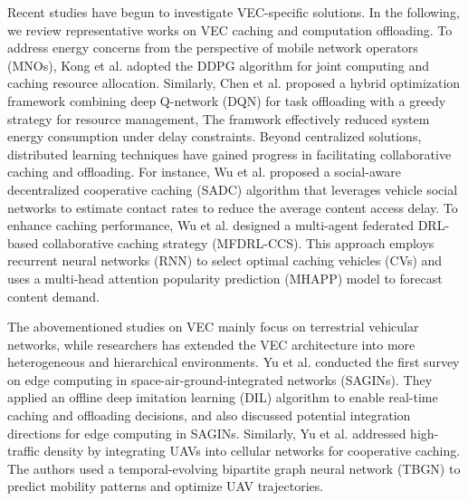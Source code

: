 \documentclass[lettersize,journal]{IEEEtran}
\begin{document}
Recent studies have begun to investigate VEC-specific solutions.
In the following, we review representative works on VEC caching and computation offloading.
%
To address energy concerns from the perspective of mobile network operators (MNOs), Kong et al. \cite{KongDuan-10} adopted the DDPG algorithm for joint computing and caching resource allocation.
%
Similarly, Chen et al. \cite{ChenBhargava-9} proposed a hybrid optimization framework combining deep Q-network (DQN) for task offloading with a greedy strategy for resource management, The framwork effectively reduced  system energy consumption under delay constraints.
% 
Beyond centralized solutions, distributed learning techniques have gained progress in facilitating collaborative caching and offloading.
% 
For instance, Wu et al. \cite{WuFan-15} proposed a social-aware decentralized cooperative caching (SADC) algorithm that leverages vehicle social networks to estimate contact rates to reduce the average content access delay.
% 
To enhance caching performance, Wu et al. \cite{WuWang-16} designed a multi-agent federated DRL-based collaborative caching strategy (MFDRL-CCS). This approach employs recurrent neural networks (RNN) to select optimal caching vehicles (CVs) and uses a multi-head attention popularity prediction (MHAPP) model to forecast content demand.
% 

The abovementioned studies on VEC mainly focus on terrestrial vehicular networks, while researchers has extended the VEC architecture into more heterogeneous and hierarchical environments.
%
Yu et al. \cite{YuGong-11} conducted the first survey on edge computing in space-air-ground-integrated networks (SAGINs). They applied an offline deep imitation learning (DIL) algorithm to enable real-time caching and offloading decisions, and also discussed potential integration directions for edge computing in SAGINs.
% 
Similarly, Yu et al.\cite{YuWu-35} addressed high-traffic density by integrating UAVs into cellular networks for cooperative caching. The authors used a temporal-evolving bipartite graph neural network (TBGN) to predict mobility patterns and optimize UAV trajectories.
\end{document}
